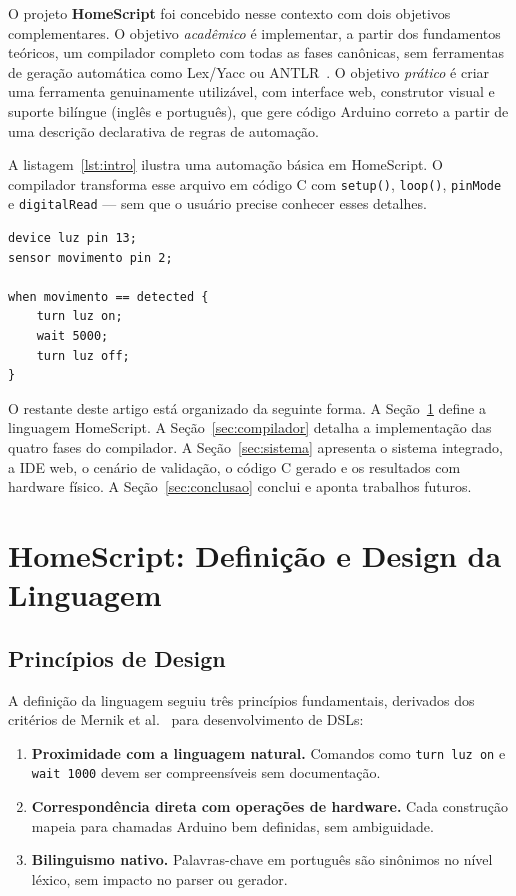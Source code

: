 \documentclass[conference]{IEEEtran}
\begin{document}
O projeto \textbf{HomeScript} foi concebido nesse contexto com dois objetivos
complementares. O objetivo \emph{acadêmico} é implementar, a partir dos
fundamentos teóricos, um compilador completo com todas as fases canônicas,
sem ferramentas de geração automática como Lex/Yacc ou
ANTLR~\cite{parr2013}. O objetivo \emph{prático} é criar uma ferramenta
genuinamente utilizável, com interface web, construtor visual e suporte
bilíngue (inglês e português), que gere código Arduino correto a partir de
uma descrição declarativa de regras de automação.

A listagem~\ref{lst:intro} ilustra uma automação básica em HomeScript. O
compilador transforma esse arquivo em código C com \texttt{setup()},
\texttt{loop()}, \texttt{pinMode} e \texttt{digitalRead} — sem que o
usuário precise conhecer esses detalhes.

\begin{lstlisting}[style=homescript,caption={Automação básica em HomeScript.},label={lst:intro}]
device luz pin 13;
sensor movimento pin 2;

when movimento == detected {
    turn luz on;
    wait 5000;
    turn luz off;
}
\end{lstlisting}

O restante deste artigo está organizado da seguinte forma. A
Seção~\ref{sec:linguagem} define a linguagem HomeScript. A
Seção~\ref{sec:compilador} detalha a implementação das quatro fases do
compilador. A Seção~\ref{sec:sistema} apresenta o sistema integrado, a IDE
web, o cenário de validação, o código C gerado e os resultados com hardware
físico. A Seção~\ref{sec:conclusao} conclui e aponta trabalhos futuros.

\section{HomeScript: Definição e Design da Linguagem}
\label{sec:linguagem}

\subsection{Princípios de Design}

A definição da linguagem seguiu três princípios fundamentais, derivados dos
critérios de Mernik et al.~\cite{mernik2005} para desenvolvimento de DSLs:

\begin{enumerate}
\item \textbf{Proximidade com a linguagem natural.} Comandos como
\texttt{turn luz on} e \texttt{wait 1000} devem ser compreensíveis sem
documentação.
\item \textbf{Correspondência direta com operações de hardware.} Cada
construção mapeia para chamadas Arduino bem definidas, sem ambiguidade.
\item \textbf{Bilinguismo nativo.} Palavras-chave em português são sinônimos
no nível léxico, sem impacto no parser ou gerador.
\end{enumerate}
\end{document}
